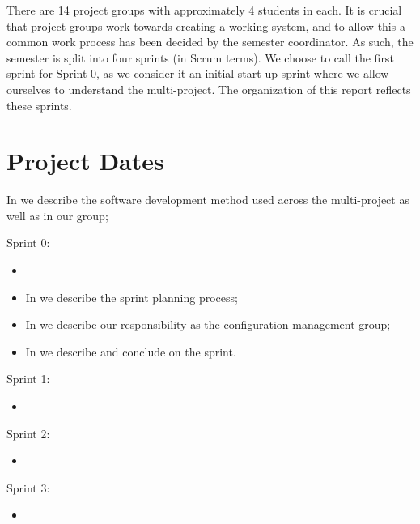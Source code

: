 There are 14 project groups with approximately 4 students in each. It is crucial that project groups work towards creating a working system, and to allow this a common work process has been decided by the semester coordinator. As such, the semester is split into four sprints (in Scrum terms). We choose to call the first sprint for Sprint 0, as we consider it an initial start-up sprint where we allow ourselves to understand the multi-project. 
The organization of this report reflects these sprints. 

\section{Project Dates}

\begin{documentorganization}
  \item In  we describe the software development method used across the multi-project as well as in our group;
  \item Sprint 0:
  \begin{itemize}
    \item {}
    \item In  we describe the sprint planning process;
    \item In  we describe our responsibility as the configuration management group;
    \item In  we describe and conclude on the sprint. 
  \end{itemize}
  \item Sprint 1:
  \begin{itemize}
    \item {}
  \end{itemize}
  \item Sprint 2:
  \begin{itemize}
    \item {}
  \end{itemize}
  \item Sprint 3:
  \begin{itemize}
    \item {}
  \end{itemize}
\end{documentorganization}